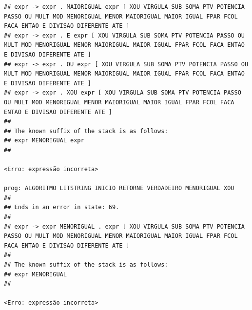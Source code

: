 \documentclass[hidelinks,12pt]{article}
\begin{document}
\begin{lstlisting}
## expr -> expr . MAIORIGUAL expr [ XOU VIRGULA SUB SOMA PTV POTENCIA PASSO OU MULT MOD MENORIGUAL MENOR MAIORIGUAL MAIOR IGUAL FPAR FCOL FACA ENTAO E DIVISAO DIFERENTE ATE ]
## expr -> expr . E expr [ XOU VIRGULA SUB SOMA PTV POTENCIA PASSO OU MULT MOD MENORIGUAL MENOR MAIORIGUAL MAIOR IGUAL FPAR FCOL FACA ENTAO E DIVISAO DIFERENTE ATE ]
## expr -> expr . OU expr [ XOU VIRGULA SUB SOMA PTV POTENCIA PASSO OU MULT MOD MENORIGUAL MENOR MAIORIGUAL MAIOR IGUAL FPAR FCOL FACA ENTAO E DIVISAO DIFERENTE ATE ]
## expr -> expr . XOU expr [ XOU VIRGULA SUB SOMA PTV POTENCIA PASSO OU MULT MOD MENORIGUAL MENOR MAIORIGUAL MAIOR IGUAL FPAR FCOL FACA ENTAO E DIVISAO DIFERENTE ATE ]
##
## The known suffix of the stack is as follows:
## expr MENORIGUAL expr 
##

<Erro: expressão incorreta>

prog: ALGORITMO LITSTRING INICIO RETORNE VERDADEIRO MENORIGUAL XOU 
##
## Ends in an error in state: 69.
##
## expr -> expr MENORIGUAL . expr [ XOU VIRGULA SUB SOMA PTV POTENCIA PASSO OU MULT MOD MENORIGUAL MENOR MAIORIGUAL MAIOR IGUAL FPAR FCOL FACA ENTAO E DIVISAO DIFERENTE ATE ]
##
## The known suffix of the stack is as follows:
## expr MENORIGUAL 
##

<Erro: expressão incorreta>


\end{lstlisting}
\end{document}
